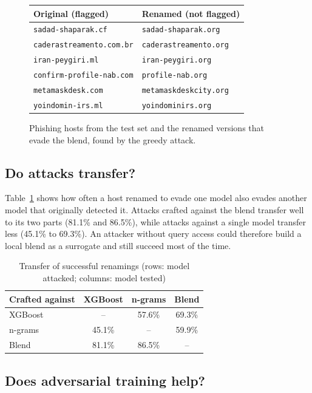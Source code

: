\documentclass[conference]{IEEEtran}
\begin{document}
\begin{figure}[t]
\centering
\footnotesize
\begin{tabular}{@{}ll@{}}
\toprule
Original (flagged) & Renamed (not flagged) \\
\midrule
\texttt{sadad-shaparak.cf} & \texttt{sadad-shaparak.org} \\
\texttt{caderastreamento.com.br} & \texttt{caderastreamento.org} \\
\texttt{iran-peygiri.ml} & \texttt{iran-peygiri.org} \\
\texttt{confirm-profile-nab.com} & \texttt{profile-nab.org} \\
\texttt{metamaskdesk.com} & \texttt{metamaskdeskcity.org} \\
\texttt{yoindomin-irs.ml} & \texttt{yoindominirs.org} \\
\bottomrule
\end{tabular}
\caption{Phishing hosts from the test set and the renamed versions that evade the blend, found by the greedy attack.}
\label{fig:examples}
\end{figure}

\subsection{Do attacks transfer?}

Table~\ref{tab:transfer} shows how often a host renamed to evade one model also evades another model that originally detected it. Attacks crafted against the blend transfer well to its two parts (81.1\% and 86.5\%), while attacks against a single model transfer less (45.1\% to 69.3\%). An attacker without query access could therefore build a local blend as a surrogate and still succeed most of the time.

\begin{table}[t]
\centering
\caption{Transfer of successful renamings (rows: model attacked; columns: model tested)}
\label{tab:transfer}
\begin{tabular}{@{}lccc@{}}
\toprule
Crafted against & XGBoost & n-grams & Blend \\
\midrule
XGBoost & -- & 57.6\% & 69.3\% \\
n-grams & 45.1\% & -- & 59.9\% \\
Blend & 81.1\% & 86.5\% & -- \\
\bottomrule
\end{tabular}
\end{table}

\subsection{Does adversarial training help?}
\end{document}
